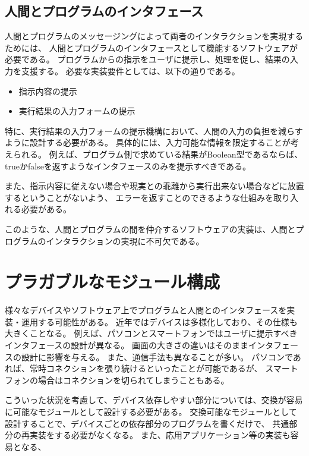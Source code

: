 \subsection{人間とプログラムのインタフェース}\label{ux4ebaux9593ux3068ux30d7ux30edux30b0ux30e9ux30e0ux306eux30a4ux30f3ux30bfux30d5ux30a7ux30fcux30b9}

人間とプログラムのメッセージングによって両者のインタラクションを実現するためには、
人間とプログラムのインタフェースとして機能するソフトウェアが必要である。
プログラムからの指示をユーザに提示し、処理を促し、結果の入力を支援する。
必要な実装要件としては、以下の通りである。

\begin{itemize}
\itemsep1pt\parskip0pt
\item
  指示内容の提示
\item
  実行結果の入力フォームの提示
\end{itemize}

特に、実行結果の入力フォームの提示機構において、人間の入力の負担を減らすように設計する必要がある。
具体的には、入力可能な情報を限定することが考えられる。
例えば、プログラム側で求めている結果がBoolean型であるならば、trueかfalseを返すようなインタフェースのみを提示すべきである。

また、指示内容に従えない場合や現実との乖離から実行出来ない場合などに放置するということがないよう、
エラーを返すことのできるような仕組みを取り入れる必要がある。

このような、人間とプログラムの間を仲介するソフトウェアの実装は、人間とプログラムのインタラクションの実現に不可欠である。

\section{プラガブルなモジュール構成}\label{sec:plaggable-module-design}

様々なデバイスやソフトウェア上でプログラムと人間とのインタフェースを実装・運用する可能性がある。
近年ではデバイスは多様化しており、その仕様も大きくことなる。
例えば、パソコンとスマートフォンではユーザに提示すべきインタフェースの設計が異なる。
画面の大きさの違いはそのままインタフェースの設計に影響を与える。
また、通信手法も異なることが多い。
パソコンであれば、常時コネクションを張り続けるといったことが可能であるが、
スマートフォンの場合はコネクションを切られてしまうこともある。

こういった状況を考慮して、デバイス依存しやすい部分については、交換が容易に可能なモジュールとして設計する必要がある。
交換可能なモジュールとして設計することで、デバイスごとの依存部分のプログラムを書くだけで、
共通部分の再実装をする必要がなくなる。
また、応用アプリケーション等の実装も容易となる、

